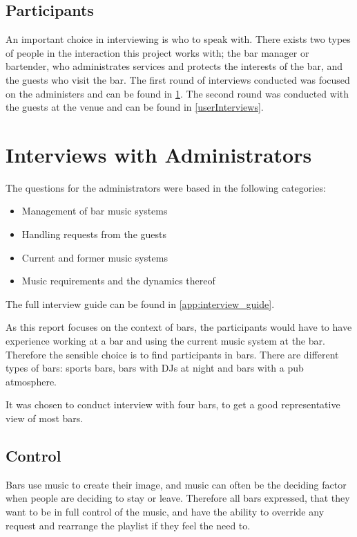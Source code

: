 \subsection{Participants}
An important choice in interviewing is who to speak with. There exists two types of people in the interaction this project works with; the bar manager or bartender, who administrates services and protects the interests of the bar, and the guests who visit the bar. The first round of interviews conducted was focused on the administers and can be found in \cref{sub:administersinterviews}. The second round was conducted with the guests at the venue and can be found in \cref{userInterviews}.

\section{Interviews with Administrators}
\label{sub:administersinterviews}
The questions for the administrators were based in the following categories:

\begin{itemize}
  \item Management of bar music systems
  \item Handling requests from the guests
  \item Current and former music systems
  \item Music requirements and the dynamics thereof
\end{itemize}

The full interview guide can be found in \cref{app:interview_guide}.

As this report focuses on the context of bars, the participants would have to have experience working at a bar and using the current music system at the bar. Therefore the sensible choice is to find participants in bars. There are different types of bars: sports bars, bars with DJs at night and bars with a pub atmosphere.

It was chosen to conduct interview with four bars, to get a good representative view of most bars.

\subsection{Control}
\label{sub:Control}
Bars use music to create their image, and music can often be the deciding factor when people are deciding to stay or leave. Therefore all bars expressed, that they want to be in full control of the music, and have the ability to override any request and rearrange the playlist if they feel the need to.

